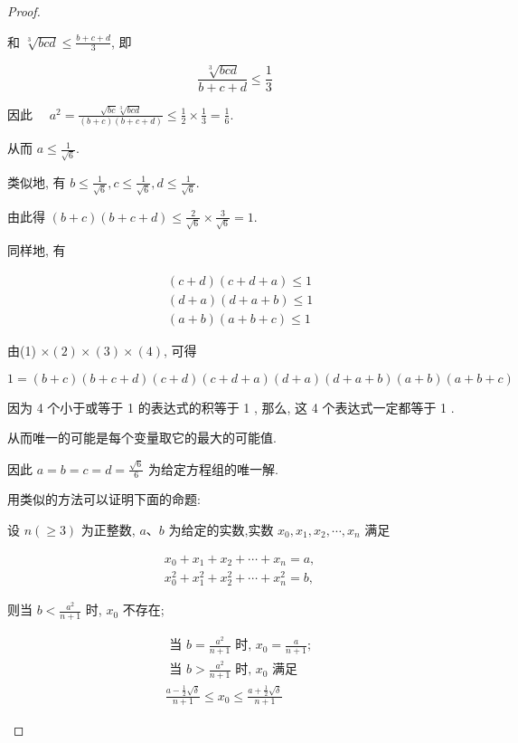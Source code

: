 \begin{proof}
\begin{example}
\begin{solution}
\begin{solution}
	和 $\sqrt[3]{b c d} \leqslant \frac{b+c+d}{3}$, 即
	
	$$
	\frac{\sqrt[3]{b c d}}{b+c+d} \leqslant \frac{1}{3}
	$$
	
	因此 $\quad a^{2}=\frac{\sqrt{b c} \sqrt[3]{b c d}}{(b+c)(b+c+d)} \leqslant \frac{1}{2} \times \frac{1}{3}=\frac{1}{6}$.
	
	从而 $a \leqslant \frac{1}{\sqrt{6}}$.
	
	类似地, 有 $b \leqslant \frac{1}{\sqrt{6}}, c \leqslant \frac{1}{\sqrt{6}}, d \leqslant \frac{1}{\sqrt{6}}$.
	
	由此得 $(b+c)(b+c+d) \leqslant \frac{2}{\sqrt{6}} \times \frac{3}{\sqrt{6}}=1$.
	
	同样地, 有
	
	$$
	\begin{aligned}
	& (c+d)(c+d+a) \leqslant 1 \\
	& (d+a)(d+a+b) \leqslant 1 \\
	& (a+b)(a+b+c) \leqslant 1
	\end{aligned}
	$$
	
	由(1) $\times(2) \times(3) \times(4)$, 可得
	
	$$
	1=(b+c)(b+c+d)(c+d)(c+d+a)(d+a)(d+a+b)(a+b)(a+b+c)
	$$
	
	因为 4 个小于或等于 1 的表达式的积等于 1 , 那么, 这 4 个表达式一定都等于 1 .
	
	从而唯一的可能是每个变量取它的最大的可能值.
	
	因此 $a=b=c=d=\frac{\sqrt{6}}{6}$ 为给定方程组的唯一解.
\end{solution}
\begin{note}
	用类似的方法可以证明下面的命题:
	
	设 $n(\geqslant 3)$ 为正整数, $a 、 b$ 为给定的实数,实数 $x_{0}, x_{1}, x_{2}, \cdots, x_{n}$ 满足
	
	$$
	\begin{aligned}
	& x_{0}+x_{1}+x_{2}+\cdots+x_{n}=a, \\
	& x_{0}^{2}+x_{1}^{2}+x_{2}^{2}+\cdots+x_{n}^{2}=b,
	\end{aligned}
	$$
	
	则当 $b<\frac{a^{2}}{n+1}$ 时, $x_{0}$ 不存在;
	
	$$
	\begin{aligned}
	& \text { 当 } b=\frac{a^{2}}{n+1} \text { 时, } x_{0}=\frac{a}{n+1} \text {; } \\
	& \text { 当 } b>\frac{a^{2}}{n+1} \text { 时, } x_{0} \text { 满足 } \\
	& \frac{a-\frac{1}{2} \sqrt{\delta}}{n+1} \leqslant x_{0} \leqslant \frac{a+\frac{1}{2} \sqrt{\delta}}{n+1}
	\end{aligned}
	$$
	

\end{note}
\end{solution}
\end{example}
\end{proof}
